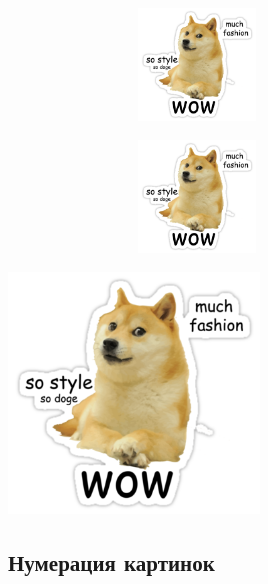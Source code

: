 \documentclass[12pt, a4paper]{article}
\begin{document}
\includegraphics[height=3cm,width=10cm]{doge.png}

\includegraphics[height=3cm,width=10cm,keepaspectratio]{doge.png}

\includegraphics[width=0.5\textwidth]{doge.png}

% 
% 
%





\subsection{Нумерация картинок}

\end{document}
